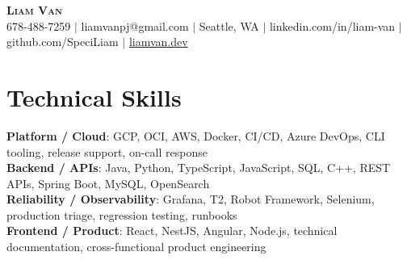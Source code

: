 \documentclass[letterpaper,11pt]{article}
\begin{document}

%
\begin{center}
    \textbf{\Huge \scshape Liam Van} \\ \vspace{1pt}
    \small 678-488-7259 $|$ \small {liamvanpj@gmail.com} $|$ Seattle, WA
 {{$|$ linkedin.com/in/liam-van} {$|$ github.com/SpeciLiam} {$|$ \href{https://liamvan.dev}{liamvan.dev}}}

\end{center}

\section{Technical Skills}
 \begin{itemize}[leftmargin=0.15in, label={}]
    \small{\item{
     \textbf{Platform / Cloud}{: GCP, OCI, AWS, Docker, CI/CD, Azure DevOps, CLI tooling, release support, on-call response} \\
     \textbf{Backend / APIs}{: Java, Python, TypeScript, JavaScript, SQL, C++, REST APIs, Spring Boot, MySQL, OpenSearch} \\
     \textbf{Reliability / Observability}{: Grafana, T2, Robot Framework, Selenium, production triage, regression testing, runbooks} \\
     \textbf{Frontend / Product}{: React, NestJS, Angular, Node.js, technical documentation, cross-functional product engineering} \\
    }}
 \end{itemize}
%
\end{document}
